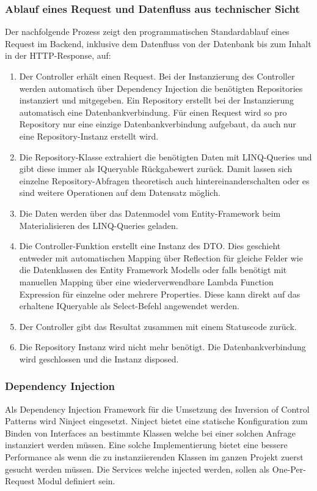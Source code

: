 \documentclass[a4paper,10pt,xetex]{article}
\begin{document}
\subsubsection{Ablauf eines Request und Datenfluss aus technischer Sicht}\label{ablauf-request}
Der nachfolgende Prozess zeigt den programmatischen Standardablauf eines Request im Backend, inklusive dem Datenfluss
von der Datenbank bis zum Inhalt in der HTTP-Response, auf:

\begin{enumerate}
  \item
    Der Controller erh\"alt einen Request. Bei der Instanzierung des Controller werden automatisch \"uber Dependency Injection
    die ben\"otigten Repositories instanziert und mitgegeben. Ein Repository erstellt bei der Instanzierung automatisch
    eine Datenbankverbindung. F\"ur einen Request wird so pro Repository nur eine einzige Datenbankverbindung aufgebaut, da
    auch nur eine Repository-Instanz erstellt wird.
  \item
    Die Repository-Klasse extrahiert die ben\"otigten Daten mit LINQ-Queries und gibt diese immer als IQueryable
    R\"uckgabewert zur\"uck. Damit lassen sich einzelne Repository-Abfragen theoretisch auch hintereinanderschalten oder es
    sind weitere Operationen auf dem Datensatz m\"oglich.
  \item
    Die Daten werden \"uber das Datenmodel vom Entity-Framework beim Materialisieren des LINQ-Queries geladen.
  \item
    Die Controller-Funktion erstellt eine Instanz des DTO. Dies geschieht entweder mit automatischen Mapping \"uber
    Reflection f\"ur gleiche Felder wie die Datenklassen des Entity Framework Modells oder falls ben\"otigt mit manuellen
    Mapping \"uber eine wiederverwendbare Lambda Function Expression f\"ur einzelne oder mehrere Properties. Diese kann
    direkt auf das erhaltene IQueryable als Select-Befehl angewendet werden.
  \item
    Der Controller gibt das Resultat zusammen mit einem Statuscode zur\"uck.
  \item
    Die Repository Instanz wird nicht mehr ben\"otigt. Die Datenbankverbindung wird geschlossen und die Instanz disposed.
\end{enumerate}

\subsubsection{Dependency Injection}\label{dependency-injection}
Als Dependency Injection Framework f\"ur die Umsetzung des Inversion of Control Patterns wird Ninject eingesetzt.
Ninject bietet eine statische Konfiguration zum Binden von Interfaces an bestimmte Klassen welche bei einer solchen
Anfrage instanziert werden m\"ussen. Eine solche Implementierung bietet eine bessere Performance als wenn die zu
instanziierenden Klassen im ganzen Projekt zuerst gesucht werden m\"ussen. Die Services welche injected werden, sollen
als One-Per-Request Modul definiert sein.
\end{document}

